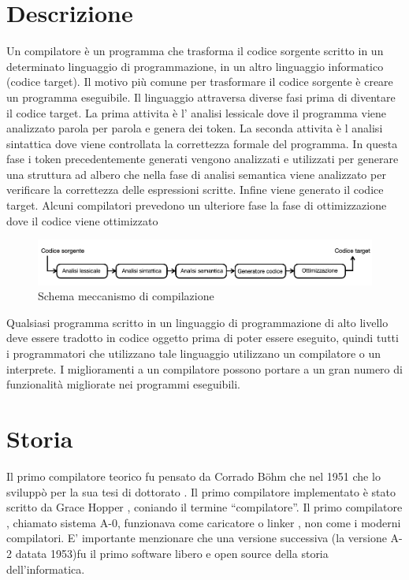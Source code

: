 \documentclass[12pt,a4paper]{report}
\begin{document}
\section{Descrizione}
Un compilatore è un programma che trasforma il codice sorgente scritto in un determinato linguaggio di programmazione,  in un altro linguaggio informatico (codice target). Il motivo più comune per trasformare il codice sorgente è creare un programma eseguibile. Il linguaggio attraversa diverse fasi prima di diventare il codice target. La prima attivita è l' analisi lessicale dove il programma viene analizzato parola per parola e genera dei token. La seconda attivita è l analisi sintattica dove viene controllata la correttezza formale del programma. In questa fase i token precedentemente generati vengono analizzati e utilizzati per generare una struttura ad albero che nella fase di analisi semantica viene analizzato per verificare la correttezza delle espressioni scritte.  Infine viene generato il codice target.  Alcuni compilatori prevedono un ulteriore fase la fase di ottimizzazione dove il codice viene ottimizzato 
\begin{figure}
\includegraphics[width = \textwidth]{SchemaCompilatore.png}
\caption{Schema meccanismo di compilazione}
\label{Fig:MeccanismoCompilazione}
\end{figure}


Qualsiasi programma scritto in un linguaggio di programmazione di alto livello deve essere tradotto in codice oggetto prima di poter essere eseguito, quindi tutti i programmatori che utilizzano tale linguaggio utilizzano un compilatore o un interprete. I miglioramenti a un compilatore possono portare a un gran numero di funzionalità migliorate nei programmi eseguibili.

\section{Storia}
Il primo compilatore teorico fu pensato da Corrado Böhm che nel 1951 che lo sviluppò per la sua tesi di dottorato . Il primo compilatore implementato è stato scritto da Grace Hopper , coniando il termine ``compilatore''. Il primo compilatore , chiamato sistema A-0,  funzionava come caricatore o linker , non come i moderni compilatori. E' importante menzionare che una versione successiva (la versione A-2 datata 1953)fu il primo software libero e open source della storia dell'informatica.
\end{document}
